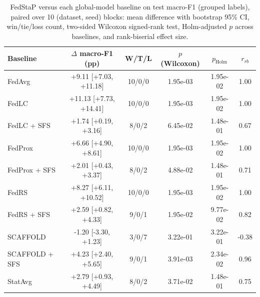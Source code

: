 \begin{table}[t]
\centering
\caption{FedStaP versus each global-model baseline on test macro-F1 (grouped labels), paired over 10 (dataset, seed) blocks: mean difference with bootstrap 95\% CI, win/tie/loss count, two-sided Wilcoxon signed-rank test, Holm-adjusted $p$ across baselines, and rank-biserial effect size.}
\label{tab:stats_grouped}
\small
\begin{tabular}{lccccc}
\toprule
Baseline & $\Delta$ macro-F1 (pp) & W/T/L & $p$ (Wilcoxon) & $p_{\text{Holm}}$ & $r_{rb}$ \\
\midrule
FedAvg & +9.11 [+7.03, +11.18] & 10/0/0 & 1.95e-03 & 1.95e-02 & 1.00 \\
FedLC & +11.13 [+7.73, +14.41] & 10/0/0 & 1.95e-03 & 1.95e-02 & 1.00 \\
FedLC + SFS & +1.74 [+0.19, +3.16] & 8/0/2 & 6.45e-02 & 1.48e-01 & 0.67 \\
FedProx & +6.66 [+4.90, +8.61] & 10/0/0 & 1.95e-03 & 1.95e-02 & 1.00 \\
FedProx + SFS & +2.01 [+0.43, +3.37] & 8/0/2 & 4.88e-02 & 1.48e-01 & 0.71 \\
FedRS & +8.27 [+6.11, +10.52] & 10/0/0 & 1.95e-03 & 1.95e-02 & 1.00 \\
FedRS + SFS & +2.59 [+0.82, +4.33] & 9/0/1 & 1.95e-02 & 9.77e-02 & 0.82 \\
SCAFFOLD & -1.20 [-3.30, +1.23] & 3/0/7 & 3.22e-01 & 3.22e-01 & -0.38 \\
SCAFFOLD + SFS & +4.23 [+2.40, +5.65] & 9/0/1 & 3.91e-03 & 2.34e-02 & 0.96 \\
StatAvg & +2.79 [+0.93, +4.49] & 8/0/2 & 3.71e-02 & 1.48e-01 & 0.75 \\
\bottomrule
\end{tabular}
\end{table}
